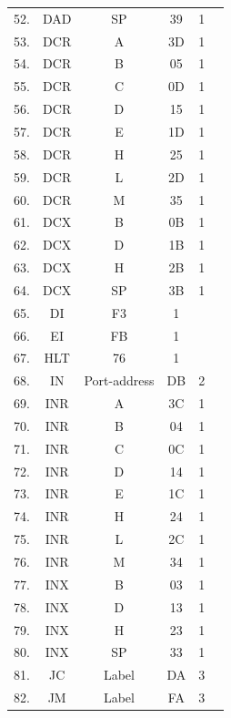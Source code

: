 \documentclass{scrreprt}
\begin{document}
\begin{longtable}{|c|c|c|c|c|c|}
52.  & DAD  & SP           & 39   & 1  &   \\
53.  & DCR  & A            & 3D   & 1  &   \\
54.  & DCR  & B            & 05   & 1  &   \\
55.  & DCR  & C            & 0D   & 1  &   \\
56.  & DCR  & D            & 15   & 1  &   \\
57.  & DCR  & E            & 1D   & 1  &   \\
58.  & DCR  & H            & 25   & 1  &   \\
59.  & DCR  & L            & 2D   & 1  &   \\
60.  & DCR  & M            & 35   & 1  &   \\
61.  & DCX  & B            & 0B   & 1  &   \\
62.  & DCX  & D            & 1B   & 1  &   \\
63.  & DCX  & H            & 2B   & 1  &   \\
64.  & DCX  & SP           & 3B   & 1  &   \\
65.  & DI   & F3           & 1    &    &   \\
66.  & EI   & FB           & 1    &    &   \\
67.  & HLT  & 76           & 1    &    &   \\
68.  & IN   & Port-address & DB   & 2  &   \\
69.  & INR  & A            & 3C   & 1  &   \\
70.  & INR  & B            & 04   & 1  &   \\
71.  & INR  & C            & 0C   & 1  &   \\
72.  & INR  & D            & 14   & 1  &   \\
73.  & INR  & E            & 1C   & 1  &   \\
74.  & INR  & H            & 24   & 1  &   \\
75.  & INR  & L            & 2C   & 1  &   \\
76.  & INR  & M            & 34   & 1  &   \\
77.  & INX  & B            & 03   & 1  &   \\
78.  & INX  & D            & 13   & 1  &   \\
79.  & INX  & H            & 23   & 1  &   \\
80.  & INX  & SP           & 33   & 1  &   \\
81.  & JC   & Label        & DA   & 3  &   \\
82.  & JM   & Label        & FA   & 3  &   \\

\end{longtable}
\end{document}
